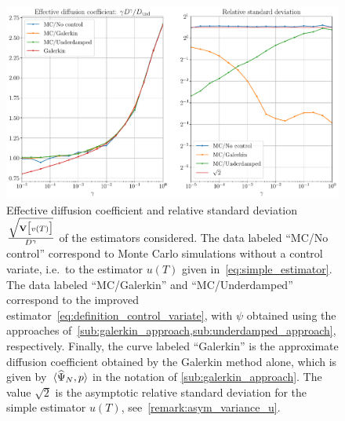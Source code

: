 \documentclass[11pt,a4paper]{article}
\begin{document}
\begin{figure}[ht]
    \centering
    \includegraphics[width=0.99\linewidth]{figures/underdamped_1d.pdf}
    \caption{
        Effective diffusion coefficient and relative standard deviation $\frac{\sqrt{\mathbf{V}\bigl[v(T)\bigr]}} {D^{\gamma}}$ of the estimators considered.
        The data labeled ``MC/No control'' correspond to Monte Carlo simulations without a control variate,
        i.e.\ to the estimator $u(T)$ given in~\eqref{eq:simple_estimator}.
        The data labeled ``MC/Galerkin'' and ``MC/Underdamped'' correspond to the improved estimator~\eqref{eq:definition_control_variate},
        with $\psi$ obtained using the approaches of~\cref{sub:galerkin_approach,sub:underdamped_approach},
        respectively.
        Finally, the curve labeled ``Galerkin'' is the approximate diffusion coefficient obtained by the Galerkin method alone,
        which is given by~$\ip*{\widehat \Psi_N}{p}$ in the notation of \cref{sub:galerkin_approach}.
        The value $\sqrt{2}$ is the asymptotic relative standard deviation for the simple estimator $u(T)$,
        see~\cref{remark:asym_variance_u}.
    }%
    \label{fig:effective_diffusion_langevin}
\end{figure}
\end{document}
